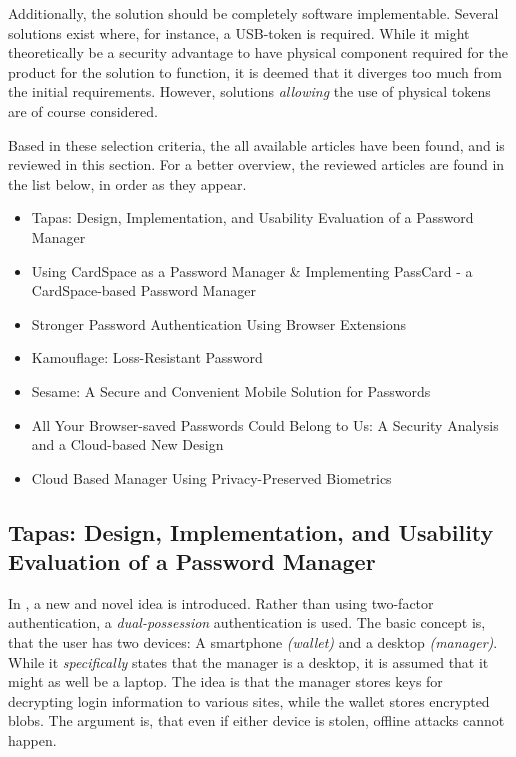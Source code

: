 		Additionally, the solution should be completely software implementable. Several solutions exist where, for instance, a USB-token is required. While it might theoretically be a security advantage to have physical component required for the product for the solution to function, it is deemed that it diverges too much from the initial requirements. However, solutions \emph{allowing} the use of physical tokens are of course considered.


		
		Based in these selection criteria, the all available articles have been found, and is reviewed in this section. For a better overview, the reviewed articles are found in the list below, in order as they appear.

		\begin{itemize}
			\item Tapas: Design, Implementation, and Usability Evaluation of a Password Manager \cite{tapas}
			\item Using CardSpace as a Password Manager \& Implementing PassCard - a CardSpace-based Password Manager \cite{cardspace,cardspace_impl}
			\item Stronger Password Authentication Using Browser Extensions
			\item Kamouflage: Loss-Resistant Password
			\item Sesame: A Secure and Convenient Mobile Solution for Passwords
			\item All Your Browser-saved Passwords Could Belong to Us: A Security Analysis and a Cloud-based New Design
			\item Cloud Based Manager Using Privacy-Preserved Biometrics
		\end{itemize}

			


		\subsection*{Tapas: Design, Implementation, and Usability Evaluation of a Password Manager}
			In \cite{tapas}, a new and novel idea is introduced. Rather than using two-factor authentication, a \emph{dual-possession} authentication is used. The basic concept is, that the user has two devices: A smartphone \emph{(wallet)} and a desktop \emph{(manager)}. While it \emph{specifically} states that the manager is a desktop, it is assumed that it might as well be a laptop. The idea is that the manager stores keys for decrypting login information to various sites, while the wallet stores encrypted blobs. The argument is, that even if either device is stolen, offline attacks cannot happen.

